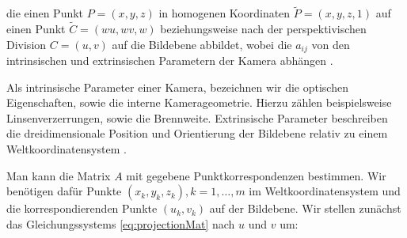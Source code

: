 die einen Punkt $P=(x,y,z)$ in homogenen Koordinaten $\tilde P = (x,y,z,1)$ auf einen Punkt $\tilde C = (wu,wv, w)$ beziehungsweise nach der perspektivischen Division $C = (u,v)$ auf die Bildebene abbildet, wobei die $a_{ij}$ von den intrinsischen und extrinsischen Parametern der Kamera abhängen \cite{Heikkila1997}.

Als intrinsische Parameter einer Kamera, bezeichnen wir die optischen Eigenschaften, sowie die interne Kamerageometrie. Hierzu zählen beispielsweise Linsenverzerrungen, sowie die Brennweite.
Extrinsische Parameter beschreiben die dreidimensionale Position und Orientierung der Bildebene relativ zu einem Weltkoordinatensystem  \cite{Tsai1987}.

%


Man kann die Matrix $A$ mit gegebene Punktkorrespondenzen bestimmen. Wir benötigen dafür Punkte $(x_k,y_k, z_k), k = 1,\dotsc,m$ im Weltkoordinatensystem und die korrespondierenden Punkte $(u_k, v_k)$ auf der Bildebene.
Wir stellen zunächst das Gleichungssystems \ref{eq:projectionMat} nach $u$ und $v$ um:

